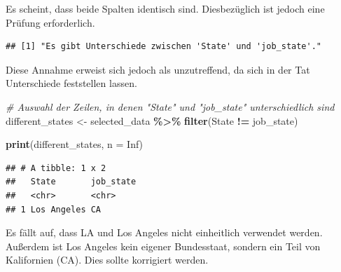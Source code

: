 \documentclass[
]{article}
\newenvironment{Shaded}{\begin{snugshade}}{\end{snugshade}}
\newcommand{\AttributeTok}[1]{\textcolor[rgb]{0.13,0.29,0.53}{#1}}
\newcommand{\CommentTok}[1]{\textcolor[rgb]{0.56,0.35,0.01}{\textit{#1}}}
\newcommand{\ConstantTok}[1]{\textcolor[rgb]{0.56,0.35,0.01}{#1}}
\newcommand{\ControlFlowTok}[1]{\textcolor[rgb]{0.13,0.29,0.53}{\textbf{#1}}}
\newcommand{\FunctionTok}[1]{\textcolor[rgb]{0.13,0.29,0.53}{\textbf{#1}}}
\newcommand{\NormalTok}[1]{#1}
\newcommand{\OtherTok}[1]{\textcolor[rgb]{0.56,0.35,0.01}{#1}}
\newcommand{\SpecialCharTok}[1]{\textcolor[rgb]{0.81,0.36,0.00}{\textbf{#1}}}
\newcommand{\StringTok}[1]{\textcolor[rgb]{0.31,0.60,0.02}{#1}}
\begin{document}
Es scheint, dass beide Spalten identisch sind. Diesbezüglich ist jedoch
eine Prüfung erforderlich.

\begin{Shaded}
\end{Shaded}

\begin{verbatim}
## [1] "Es gibt Unterschiede zwischen 'State' und 'job_state'."
\end{verbatim}

Diese Annahme erweist sich jedoch als unzutreffend, da sich in der Tat
Unterschiede feststellen lassen.

\begin{Shaded}
\begin{Highlighting}[]
\CommentTok{\# Auswahl der Zeilen, in denen "State" und "job\_state" unterschiedlich sind}
\NormalTok{different\_states }\OtherTok{\textless{}{-}}\NormalTok{ selected\_data }\SpecialCharTok{\%\textgreater{}\%}
  \FunctionTok{filter}\NormalTok{(State }\SpecialCharTok{!=}\NormalTok{ job\_state)}

\FunctionTok{print}\NormalTok{(different\_states, }\AttributeTok{n =} \ConstantTok{Inf}\NormalTok{)}
\end{Highlighting}
\end{Shaded}

\begin{verbatim}
## # A tibble: 1 x 2
##   State       job_state
##   <chr>       <chr>    
## 1 Los Angeles CA
\end{verbatim}

Es fällt auf, dass LA und Los Angeles nicht einheitlich verwendet
werden. Außerdem ist Los Angeles kein eigener Bundesstaat, sondern ein
Teil von Kalifornien (CA). Dies sollte korrigiert werden.
\end{document}
